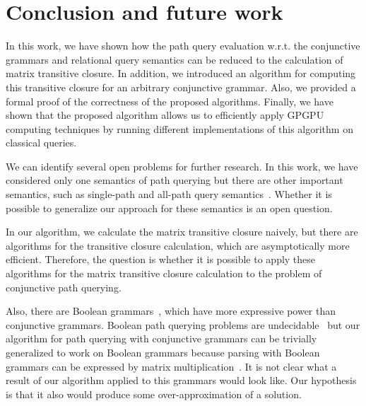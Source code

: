 \section{Conclusion and future work} \label{section_conclusion}
In this work, we have shown how the path query evaluation w.r.t. the conjunctive grammars and relational query semantics can be reduced to the calculation of matrix transitive closure. In addition, we introduced an algorithm for computing this transitive closure for an arbitrary conjunctive grammar. Also, we provided a formal proof of the correctness of the proposed algorithms. Finally, we have shown that the proposed algorithm allows us to efficiently apply GPGPU computing techniques by running different implementations of this algorithm on classical queries. 

We can identify several open problems for further research. In this work, we have considered only one semantics of path querying but there are other important semantics, such as single-path and all-path query semantics~\cite{hellingsPathQuerying}. Whether it is possible to generalize our approach for these semantics is an open question.

In our algorithm, we calculate the matrix transitive closure naively, but there are algorithms for the transitive closure calculation, which are asymptotically more efficient. Therefore, the question is whether it is possible to apply these algorithms for the matrix transitive closure calculation to the problem of conjunctive path querying.

Also, there are Boolean grammars~\cite{okhotinBoolean}, which have more expressive power than conjunctive grammars. Boolean path querying problems are undecidable~\cite{hellingsRelational} but our algorithm for path querying with conjunctive grammars can be trivially generalized to work on Boolean grammars because parsing with Boolean grammars can be expressed by matrix multiplication~\cite{okhotin_cyk}. It is not clear what a result of our algorithm applied to this grammars would look like. Our hypothesis is that it also would produce some over-approximation of a solution.
